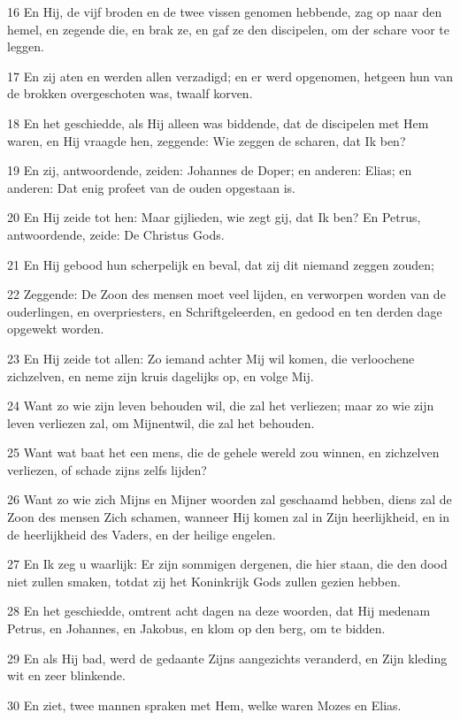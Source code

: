 \par 16 En Hij, de vijf broden en de twee vissen genomen hebbende, zag op naar den hemel, en zegende die, en brak ze, en gaf ze den discipelen, om der schare voor te leggen.
\par 17 En zij aten en werden allen verzadigd; en er werd opgenomen, hetgeen hun van de brokken overgeschoten was, twaalf korven.
\par 18 En het geschiedde, als Hij alleen was biddende, dat de discipelen met Hem waren, en Hij vraagde hen, zeggende: Wie zeggen de scharen, dat Ik ben?
\par 19 En zij, antwoordende, zeiden: Johannes de Doper; en anderen: Elias; en anderen: Dat enig profeet van de ouden opgestaan is.
\par 20 En Hij zeide tot hen: Maar gijlieden, wie zegt gij, dat Ik ben? En Petrus, antwoordende, zeide: De Christus Gods.
\par 21 En Hij gebood hun scherpelijk en beval, dat zij dit niemand zeggen zouden;
\par 22 Zeggende: De Zoon des mensen moet veel lijden, en verworpen worden van de ouderlingen, en overpriesters, en Schriftgeleerden, en gedood en ten derden dage opgewekt worden.
\par 23 En Hij zeide tot allen: Zo iemand achter Mij wil komen, die verloochene zichzelven, en neme zijn kruis dagelijks op, en volge Mij.
\par 24 Want zo wie zijn leven behouden wil, die zal het verliezen; maar zo wie zijn leven verliezen zal, om Mijnentwil, die zal het behouden.
\par 25 Want wat baat het een mens, die de gehele wereld zou winnen, en zichzelven verliezen, of schade zijns zelfs lijden?
\par 26 Want zo wie zich Mijns en Mijner woorden zal geschaamd hebben, diens zal de Zoon des mensen Zich schamen, wanneer Hij komen zal in Zijn heerlijkheid, en in de heerlijkheid des Vaders, en der heilige engelen.
\par 27 En Ik zeg u waarlijk: Er zijn sommigen dergenen, die hier staan, die den dood niet zullen smaken, totdat zij het Koninkrijk Gods zullen gezien hebben.
\par 28 En het geschiedde, omtrent acht dagen na deze woorden, dat Hij medenam Petrus, en Johannes, en Jakobus, en klom op den berg, om te bidden.
\par 29 En als Hij bad, werd de gedaante Zijns aangezichts veranderd, en Zijn kleding wit en zeer blinkende.
\par 30 En ziet, twee mannen spraken met Hem, welke waren Mozes en Elias.
